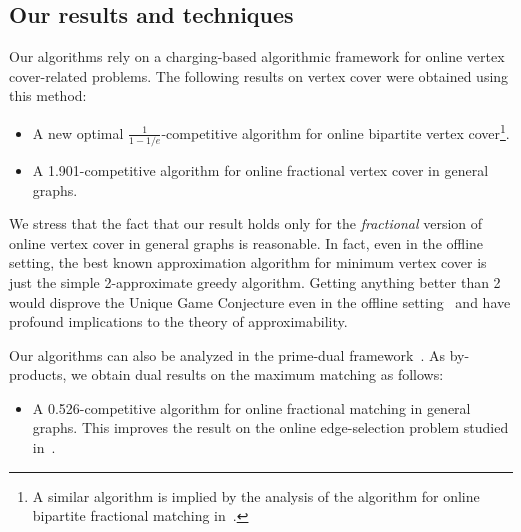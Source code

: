 \documentclass{article}
\begin{document}
\subsection{Our results and techniques}

Our algorithms rely on a charging-based algorithmic framework for online vertex cover-related problems. The following results on vertex cover were obtained using this method:
\begin{itemize}
\item A new optimal $\frac{1}{1-1/e}$-competitive algorithm for online bipartite vertex cover\footnote{A similar algorithm is implied by the analysis of the algorithm for online bipartite fractional matching in~\cite{Buchbinder2007}.}.
\item A 1.901-competitive algorithm for online fractional vertex cover in general graphs.
\end{itemize}

We stress that the fact that our result holds only for the \emph{fractional} version of online vertex cover in general graphs is reasonable. In fact, even in the offline setting, the best known approximation algorithm for minimum vertex cover is just the simple 2-approximate greedy algorithm. Getting anything better than 2 would disprove the Unique Game Conjecture even in the offline setting~\cite{Khot2008} and have profound implications to the theory of approximability.

Our algorithms can also be analyzed in the prime-dual framework~\cite{Buchbinder2007}. As by-products, we obtain dual results on the maximum matching as follows:
\begin{itemize}
\item A 0.526-competitive algorithm for online fractional matching in general graphs. This improves the result on the online edge-selection problem studied in~\cite{Blum2006}.
\end{itemize}
\end{document}
